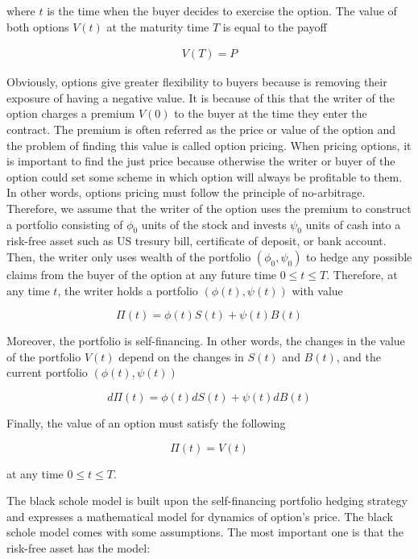 where $t$ is the time when the buyer decides to exercise the option. 
The value of both options $V(t)$ at the maturity time $T$ is 
equal to the payoff

\begin{align}
  V(T) = P
\end{align}

Obviously, options give greater flexibility 
to buyers because is removing their exposure of having a negative value.
It is because of this that the writer of the option charges a premium $V(0)$ to the buyer
at the time they enter the contract. The premium is often referred as the price or value 
of the option and the problem of finding this value is called option pricing. 
When pricing options, it is important to find the just price because 
otherwise the writer or buyer of the option could set some scheme in which option
will always be profitable to them. In other words, options pricing must follow
the principle of no-arbitrage. Therefore, we assume that the writer of the option
uses the premium to construct a portfolio consisting of $\phi_0$ units of the 
stock and invests $\psi_0$ units of cash into a risk-free asset such as US
tresury bill, certificate of deposit, or bank account. Then, the writer only 
uses wealth of the portfolio $(\phi_0, \psi_0)$ to hedge any 
possible claims from the buyer of the option at any future time $0 \le t \le T$. 
Therefore, at any time $t$, the writer holds a portfolio $(\phi(t), \psi(t))$ 
with value

\begin{equation}
  \Pi(t) = \phi(t)S(t) + \psi(t)B(t)
\end{equation}

Moreover, the portfolio is self-financing. In other words, the changes in the value
of the portfolio $V(t)$ depend on the changes in $S(t)$ and $B(t)$, and the current
portfolio $(\phi(t), \psi(t))$

\begin{equation}
  d\Pi(t) = \phi(t)dS(t) + \psi(t)dB(t)
\end{equation}

Finally, the value of an option must satisfy the following

\begin{equation}
  \Pi(t) = V(t)
\end{equation}

at any time $0 \le t \le T$.

The black schole model is built upon the self-financing portfolio hedging strategy 
and expresses a mathematical model for dynamics of option's price. 
The black schole model comes with some assumptions. The most important one is 
that the risk-free asset has the model:

